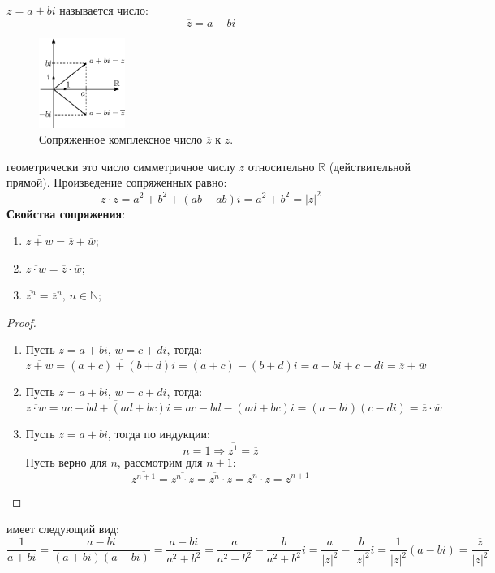 \documentclass[12pt]{article}
\newcommand{\MR}{\mathbb{R}}
\newcommand{\MN}{\mathbb{N}}
\theoremstyle{definition}
\begin{document}
 $z = a + bi$ называется число:
$$
	\overline{z} = a - bi
$$
\begin{figure}[H]
	\centering
	\includegraphics[width=0.25\textwidth]{AL1S1_3.eps}
	\caption{Сопряженное комплексное число $\overline{z}$ к $z$.}
	\label{1_3}
\end{figure}
геометрически это число симметричное числу $z$ относительно $\MR$ (действительной прямой). Произведение сопряженных равно:
$$
	z{\cdot}\overline{z} = a^2 +b^2 + (ab - ab)i = a^2 + b^2 = |z|^2
$$
\textbf{Свойства сопряжения}:
\begin{enumerate}[label=\arabic*)]
	\item $\overline{z + w} = \overline{z} + \overline{w}$;
	\item $\overline{z{\cdot}w} = \overline{z}{\cdot}\overline{w}$;
	\item $\overline{z^n} = \overline{z}^n, \, n \in \MN$;
\end{enumerate}
\begin{proof}\hfill
	\begin{enumerate}[label=\arabic*)]
		\item Пусть $z = a + bi, \, w = c + di$, тогда:
		$$
			\overline{z + w} = \overline{(a +c) + (b+ d)i} = (a+ c) - (b+d)i = a -bi + c - di = \overline{z} + \overline{w}
		$$	
		\item Пусть $z = a + bi, \, w = c + di$, тогда:
		$$
			\overline{z{\cdot}w} = \overline{ac - bd + (ad +bc)i} = ac -bd - (ad + bc)i = (a - bi)(c -di) = \overline{z}{\cdot}\overline{w}
		$$
		\item Пусть $z = a + bi$, тогда по индукции:
		$$
			n = 1 \Rightarrow \overline{z^1} = \overline{z}
		$$
		Пусть верно для $n$, рассмотрим для $n+1$:
		$$
			\overline{z^{n+1}} = \overline{z^n{\cdot}z} = \overline{z^n}{\cdot}\overline{z} = \overline{z}^n{\cdot}\overline{z} = \overline{z}^{n+1}
		$$
	\end{enumerate}
\end{proof}

 имеет следующий вид:
$$
	\dfrac{1}{a + bi} = \dfrac{a -bi}{(a+ bi)(a-bi)} = \dfrac{a - bi}{a^2 + b^2} = \dfrac{a}{a^2+b^2} - \dfrac{b}{a^2+ b^2}i = \dfrac{a}{|z|^2} - \dfrac{b}{|z|^2}i = \dfrac{1}{|z|^2}(a- bi) = \dfrac{\overline{z}}{|z|^2}
$$
\end{document}
